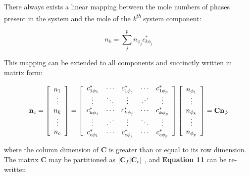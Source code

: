 \documentclass[11pt, titlepage, twoside]{article}
\begin{document}
There always exists a linear mapping between the mole numbers of phases present in the system and the mole of the \emph{k\textsuperscript{th}} system component:


\begin{MPEquation}[!ht]
\begin{equation}
{n_k} = \sum\limits_j^p {{n_{{\phi _j}}}c_{k{\phi _j}}^*}
\end{equation}
\label{MPEquationElement:33A3894F-E6C2-4FFA-9880-B419E84AF395}
\end{MPEquation}
This mapping can be extended to all components and succinctly written in matrix form:


\begin{MPEquation}[!ht]
\begin{equation}
{{\bf{n}}_c} = \left[ {\begin{array}{*{20}{c}}
{{n_1}}\\
 \vdots \\
{{n_k}}\\
 \vdots \\
{{n_c}}
\end{array}} \right] = \left[ {\begin{array}{*{20}{c}}
{c_{1{\phi _1}}^*}& \cdots &{c_{1{\phi _j}}^*}& \cdots &{c_{1{\phi _p}}^*}\\
 \vdots & \ddots & \vdots & {\mathinner{\mkern2mu\raise1pt\hbox{.}\mkern2mu
 \raise4pt\hbox{.}\mkern2mu\raise7pt\hbox{.}\mkern1mu}} & \vdots \\
{c_{k{\phi _1}}^*}& \cdots &{c_{k{\phi _j}}^*}& \cdots &{c_{k{\phi _p}}^*}\\
 \vdots & {\mathinner{\mkern2mu\raise1pt\hbox{.}\mkern2mu
 \raise4pt\hbox{.}\mkern2mu\raise7pt\hbox{.}\mkern1mu}} & \vdots & \ddots & \vdots \\
{c_{c{\phi _1}}^*}& \cdots &{c_{c{\phi _j}}^*}& \cdots &{c_{c{\phi _p}}^*}
\end{array}} \right]\left[ {\begin{array}{*{20}{c}}
{{n_{{\phi _1}}}}\\
 \vdots \\
{{n_{{\phi _k}}}}\\
 \vdots \\
{{n_{{\phi _p}}}}
\end{array}} \right] = {\bf{C}}{{\bf{n}}_{\phi}}
\end{equation}
\label{MPEquationElement:7F5060CF-6092-41F3-DDF5-B1AB004616F9}
\end{MPEquation}
where the column dimension of \textbf{C} is greater than or equal to its row dimension. The matrix \textbf{C} may be partitioned as $\left[ {{{\bf{C}}_f}|{{\bf{C}}_e}} \right]$ , and \textbf{Equation 11} can be re-written
\end{document}
